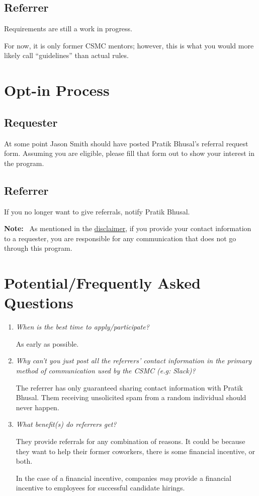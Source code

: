 \documentclass[letterpaper, 12pt]{article}
\newcommand{\currentBoss}{Jason Smith}
\newcommand{\QA}[2]{\textit{#1}\medskip

    #2\bigskip
}
\newcommand{\note}[1]{\textbf{Note:}~#1}
\begin{document}
\subsection{Referrer}

Requirements are still a work in progress.

For now, it is only former CSMC mentors; however, this is what you would more
likely call ``guidelines'' than actual rules.

\section{Opt-in Process}

\subsection{Requester}

At some point \currentBoss{} should have posted Pratik Bhusal's referral request
form. Assuming you are eligible, please fill that form out to show your interest
in the program.

\subsection{Referrer}

If you no longer want to give referrals, notify Pratik Bhusal.

\note{%
    As mentioned in the \hyperref[section:disclaimer:spamMessages]{disclaimer},
    if you provide your contact information to a requester, you are responsible
    for any communication that does not go through this program.
}

\section{Potential/Frequently Asked Questions}

\begin{enumerate}
    \item\QA%
        {When is the best time to apply/participate?}
        {As early as possible.}
    \item\QA%
        {%
            Why can't you just post all the referrers' contact information in
            the primary method of communication used by the CSMC (e.g: Slack)?
        }
        {%
            The referrer has only guaranteed sharing contact information with
            Pratik Bhusal. Them receiving unsolicited spam from a random
            individual should never happen.
        }
    \item\QA%
        {%
            What benefit(s) do referrers get?
        }
        {%
            They provide referrals for any combination of reasons. It could be
            because they want to help their former coworkers, there is some
            financial incentive, or both.

            In the case of a financial incentive, companies \textit{may} provide
            a financial incentive to employees for successful candidate hirings.
        }
\end{enumerate}
\end{document}

